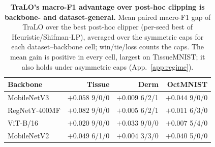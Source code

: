 \begin{table}[t]\centering\small
\setlength{\tabcolsep}{4.5pt}
\caption{\textbf{TraLO's macro-F1 advantage over post-hoc clipping is backbone- and
dataset-general.} Mean paired macro-F1 gap of TraLO over the best post-hoc clipper (per-seed
best of Heuristic/Shifman-LP), averaged over the symmetric caps for each dataset--backbone cell;
{\scriptsize win/tie/loss} counts the caps. The mean gain is positive in every cell, largest on
TissueMNIST; it also holds under asymmetric caps (App.~\ref{app:regime}).}
\label{tab:deploybb}
\begin{tabular}{l rrr}
\toprule
Backbone & Tissue & Derm & OctMNIST \\
\midrule
MobileNetV3    & $+0.058$ {\scriptsize 9/0/0} & $+0.009$ {\scriptsize 6/2/1} & $+0.044$ {\scriptsize 9/0/0} \\
RegNetY-400MF  & $+0.082$ {\scriptsize 9/0/0} & $+0.005$ {\scriptsize 6/2/1} & $+0.011$ {\scriptsize 6/3/0} \\
ViT-B/16       & $+0.020$ {\scriptsize 9/0/0} & $+0.033$ {\scriptsize 9/0/0} & $+0.007$ {\scriptsize 5/4/0} \\
MobileNetV2    & $+0.049$ {\scriptsize 6/1/0} & $+0.004$ {\scriptsize 3/3/0} & $+0.040$ {\scriptsize 5/0/0} \\
\bottomrule
\end{tabular}
\end{table}
